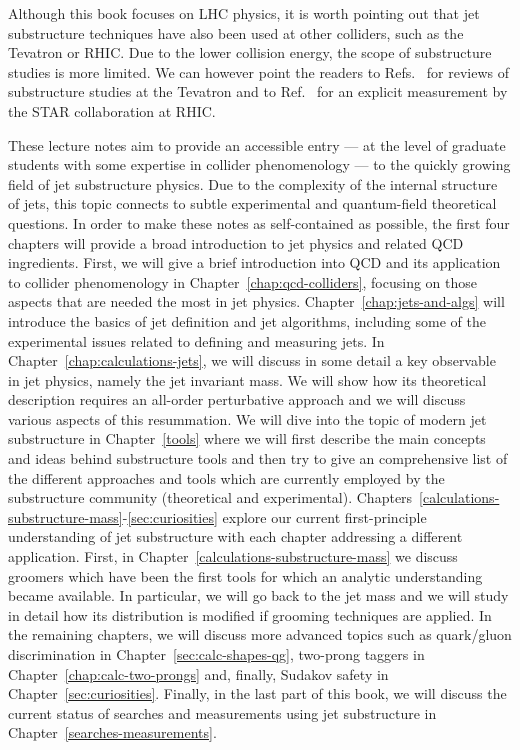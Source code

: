 Although this book focuses on LHC physics, it is worth pointing out
that jet substructure techniques have also been used at other
colliders, such as the Tevatron or RHIC. Due to the lower collision
energy, the scope of substructure studies is more limited. We can
however point the readers to
Refs.~\cite{Almeida:2011ud,Altheimer:2012mn} for reviews of
substructure studies at the Tevatron and to Ref.~\cite{Kauder:2017mhg}
for an explicit measurement by the STAR collaboration at RHIC.
 

These lecture notes aim to provide an accessible entry --- at the
level of graduate students with some expertise in collider
phenomenology --- to the quickly growing field of jet substructure
physics. Due to the complexity of the internal structure of jets, this
topic connects to subtle experimental and quantum-field theoretical
questions. In order to make these notes as self-contained as possible,
the first four chapters will provide a broad introduction to jet
physics and related QCD ingredients. First, we will give a brief
introduction into QCD and its application to collider phenomenology in
Chapter~\ref{chap:qcd-colliders}, focusing on those aspects that are
needed the most in jet physics. Chapter~\ref{chap:jets-and-algs} will
introduce the basics of jet definition and jet algorithms, including
some of the experimental issues related to defining and measuring
jets.  In Chapter~\ref{chap:calculations-jets}, we will discuss in
some detail a key observable in jet physics, namely the jet invariant
mass. We will show how its theoretical description requires an
all-order perturbative approach and we will discuss various aspects of
this resummation.
%
We will dive into the topic of modern jet substructure in
Chapter~\ref{tools} where we will  first describe the main concepts and
ideas behind substructure tools and then try to give an comprehensive
list of the different approaches and tools which are currently
employed by the substructure community (theoretical and experimental).
%
Chapters~\ref{calculations-substructure-mass}-\ref{sec:curiosities}
explore our current first-principle understanding of jet
substructure with each chapter addressing a different application.
%
First, in Chapter~\ref{calculations-substructure-mass} we discuss
groomers which have been the first tools for which an analytic
understanding became available. In particular, we will go back to the
jet mass and we will study in detail how its distribution is modified
if grooming techniques are applied.  In the remaining chapters, we
will discuss more advanced topics such as quark/gluon discrimination
in Chapter~\ref{sec:calc-shapes-qg}, two-prong taggers in
Chapter~\ref{chap:calc-two-prongs} and, finally, Sudakov safety in
Chapter~\ref{sec:curiosities}.
%
Finally, in the last part of this book, we will discuss the current
status of searches and measurements using jet substructure in
Chapter~\ref{searches-measurements}.

